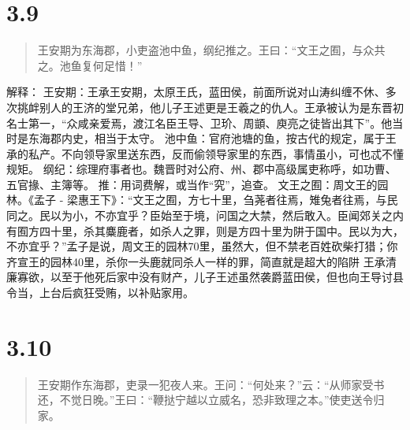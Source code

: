 \documentclass[]{book}
\begin{document}
\section{3.9}\label{section-163}

\begin{quote}
王安期为东海郡，小吏盗池中鱼，纲纪推之。王曰：``文王之囿，与众共之。池鱼复何足惜！''
\end{quote}

解释：
王安期：王承王安期，太原王氏，蓝田侯，前面所说对山涛纠缠不休、多次挑衅别人的王济的堂兄弟，他儿子王述更是王羲之的仇人。王承被认为是东晋初名士第一，``众咸亲爱焉，渡江名臣王导、卫玠、周顗、庾亮之徒皆出其下''。他当时是东海郡内史，相当于太守。
池中鱼：官府池塘的鱼，按古代的规定，属于王承的私产。不向领导家里送东西，反而偷领导家里的东西，事情虽小，可也忒不懂规矩。
纲纪：综理府事者也。魏晋时对公府、州、郡中高级属吏称呼，如功曹、五官掾、主簿等。
推：用词费解，或当作``究''，追查。 文王之囿：周文王的园林。《孟子 -
梁惠王下》：``文王之囿，方七十里，刍荛者往焉，雉兔者往焉，与民同之。民以为小，不亦宜乎？臣始至于境，问国之大禁，然后敢入。臣闻郊关之内有囿方四十里，杀其麋鹿者，如杀人之罪，则是方四十里为阱于国中。民以为大，不亦宜乎？''孟子是说，周文王的园林70里，虽然大，但不禁老百姓砍柴打猎；你齐宣王的园林40里，杀你一头鹿就同杀人一样的罪，简直就是超大的陷阱
王承清廉寡欲，以至于他死后家中没有财产，儿子王述虽然袭爵蓝田侯，但也向王导讨县令当，上台后疯狂受贿，以补贴家用。

\section{3.10}\label{section-164}

\begin{quote}
王安期作东海郡，吏录一犯夜人来。王问：``何处来？''云：``从师家受书还，不觉日晚。''王曰：``鞭挞宁越以立威名，恐非致理之本。''使吏送令归家。
\end{quote}
\end{document}
